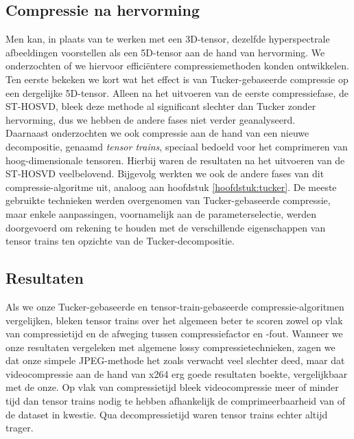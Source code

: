 \newpage
\subsection{Compressie na hervorming}

Men kan, in plaats van te werken met een 3D-tensor, dezelfde hyperspectrale afbeeldingen voorstellen als een 5D-tensor aan de hand van hervorming. We onderzochten of we hiervoor effici\"entere compressiemethoden konden ontwikkelen.\\

Ten eerste bekeken we kort wat het effect is van Tucker-gebaseerde compressie op een dergelijke 5D-tensor. Alleen na het uitvoeren van de eerste compressiefase, de ST-HOSVD, bleek deze methode al significant slechter dan Tucker zonder hervorming, dus we hebben de andere fases niet verder geanalyseerd.\\

Daarnaast onderzochten we ook compressie aan de hand van een nieuwe decompositie, genaamd \textit{tensor trains}, speciaal bedoeld voor het comprimeren van hoog-dimensionale tensoren. Hierbij waren de resultaten na het uitvoeren van de ST-HOSVD veelbelovend. Bijgevolg werkten we ook de andere fases van dit compressie-algoritme uit, analoog aan hoofdstuk \ref{hoofdstuk:tucker}. De meeste gebruikte technieken werden overgenomen van Tucker-gebaseerde compressie, maar enkele aanpassingen, voornamelijk aan de parameterselectie, werden doorgevoerd om rekening te houden met de verschillende eigenschappen van tensor trains ten opzichte van de Tucker-decompositie.

\subsection{Resultaten}

Als we onze Tucker-gebaseerde en tensor-train-gebaseerde compressie-algoritmen vergelijken, bleken tensor trains over het algemeen beter te scoren zowel op vlak van compressietijd en de afweging tussen compressiefactor en -fout. Wanneer we onze resultaten vergeleken met algemene lossy compressietechnieken, zagen we dat onze simpele JPEG-methode het zoals verwacht veel slechter deed, maar dat videocompressie aan de hand van x264 \cite{ref:x264} erg goede resultaten boekte, vergelijkbaar met de onze. Op vlak van compressietijd bleek videocompressie meer of minder tijd dan tensor trains nodig te hebben afhankelijk de comprimeerbaarheid van of de dataset in kwestie. Qua decompressietijd waren tensor trains echter altijd trager.\\

